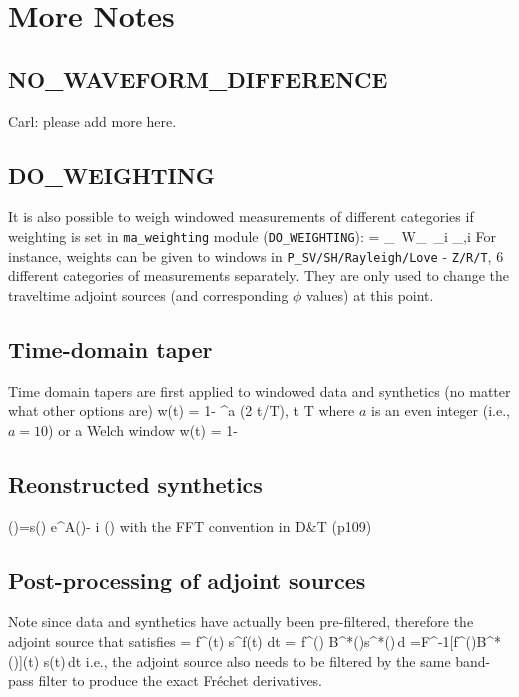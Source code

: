 \documentclass[11pt,titlepage,fleqn]{article}
\begin{document}
\section{More Notes}
\subsection{NO\_WAVEFORM\_DIFFERENCE}
Carl: please add more here.

\subsection{DO\_WEIGHTING}
It is also possible to weigh windowed measurements of different categories if weighting is set in \verb+ma_weighting+ module (\verb+DO_WEIGHTING+):
\eq
\Phi = \sum_\alpha \, W_\alpha \, \sum_i \phi_{\alpha,i}
\en
For instance, weights can be given to windows in \verb+P_SV/SH/Rayleigh/Love+ - \verb+Z/R/T+, 6 different categories of measurements separately. They are only used to change the traveltime adjoint sources (and corresponding $\phi$ values) at this
point.

\subsection{Time-domain taper}
Time domain tapers are first applied to windowed data and synthetics (no matter what other options are)
\eq
w(t) = 1- \cos^a (2 \pi t/T), \le t \le T
\en
where $a$ is an even integer (i.e., $a=10$) or a Welch window
\eq
w(t) = 1-
\en

\subsection{Reonstructed synthetics}
\eq
{}(\om)=s(\om) e^{\Delta \ln A(\om)- i \om \Delta\tau(\om)}
\en
with the FFT convention in D\&T (p109)

\subsection{Post-processing of adjoint sources}
Note since data and synthetics have actually been pre-filtered, therefore the adjoint source that satisfies
\eq
\delta \phi = \int f^\dagger (t) s^f(t) dt =  \int f^\dagger(\om) B^*(\om)s^*(\om)\,d\om
=\int F^{-1}[f^\dagger(\om)B^*(\om)](t) s(t)\,dt
\en
i.e., the adjoint source also needs to be filtered by the same band-pass filter to produce the exact Fr\'{e}chet
derivatives.
\end{document}
